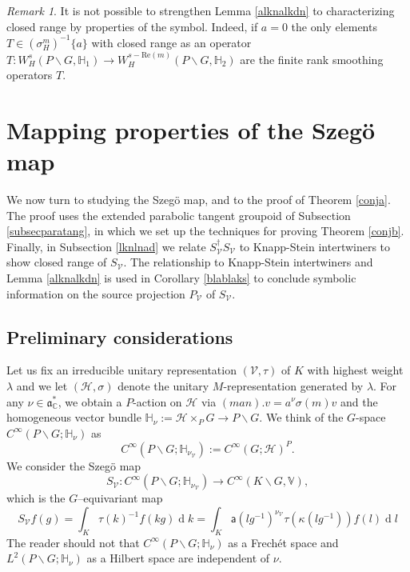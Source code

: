 \documentclass[a4paper,reqno]{amsart}
\numberwithin{equation}{section}
\def\rd{\operatorname{d}\!}
\def\C{\mathbb{C}}
\theoremstyle{definition}
\theoremstyle{remark}
\newtheorem{remark}[thm]{Remark}
\begin{document}
\begin{remark}
It is not possible to strengthen Lemma \ref{alknalkdn} to characterizing closed range by properties of the symbol. Indeed, if $a=0$ the only elements $T\in (\sigma^m_H)^{-1}\{a\}$ with closed range as an operator $T:W^s_H(P\backslash G,\mathbb{H}_1)\to W^{s-\mathrm{Re}(m)}_H(P\backslash G,\mathbb{H}_2)$ are the finite rank smoothing operators $T$.
\end{remark}

\section{Mapping properties of the Szegö map}
\label{aldknadln}

We now turn to studying the Szegö map, and to the proof of Theorem \ref{conja}. The proof uses the extended parabolic tangent groupoid of Subsection \ref{subsecparatang}, in which we set up the techniques for proving Theorem \ref{conjb}. Finally, in Subsection \ref{lknlnad} we relate $S_{\mathcal{V}}^\dagger S_{\mathcal{V}}$ to Knapp-Stein intertwiners to show closed range of $S_\mathcal{V}$. The relationship to Knapp-Stein intertwiners and Lemma \ref{alknalkdn} is used in Corollary \ref{blablaks} to conclude symbolic information on the source projection $P_\mathcal{V}$ of $S_\mathcal{V}$.

\subsection{Preliminary considerations}
\label{boundviaks}

Let us fix an irreducible unitary representation $(\mathcal{V},\tau)$ of $K$ with highest weight $\lambda$ and we let $(\mathcal{H},\sigma)$ denote the unitary $M$-representation generated by $\lambda$. For any $\nu\in \mathfrak{a}_\C^*$, we obtain a $P$-action on $\mathcal{H}$ via $(man).v=a^\nu\sigma(m)v$ and the homogeneous vector bundle $\mathbb{H}_\nu:=\mathcal{H}\times_PG\to P\backslash G$. We think of the $G$-space $C^\infty(P\backslash G;\mathbb{H}_\nu)$ as
$$C^\infty(P\backslash G;\mathbb{H}_{\nu_{\mathcal{V}}}):=C^\infty( G;\mathcal{H})^P.$$
We consider the Szegö map 
$$S_{\mathcal{V}}:C^\infty(P\backslash G;\mathbb{H}_{\nu_{\mathcal{V}}})\to C^\infty(K\backslash G,\mathbb{V}),$$
which is the $G$–equivariant map
\begin{equation}
\label{popskdps}
S_{\mathcal{V}} f(g)=\int_K \tau(k)^{-1}f(kg)\rd k=\int_K\mathsf{a}(lg^{-1})^{\nu_{\mathcal{V}}}\tau(\kappa(lg^{-1}))f(l)\rd l
\end{equation}
The reader should not that $C^\infty(P\backslash G;\mathbb{H}_\nu)$ as a Frech\'{e}t space and $L^2(P\backslash G;\mathbb{H}_\nu)$ as a Hilbert space are independent of $\nu$. 
\end{document}
